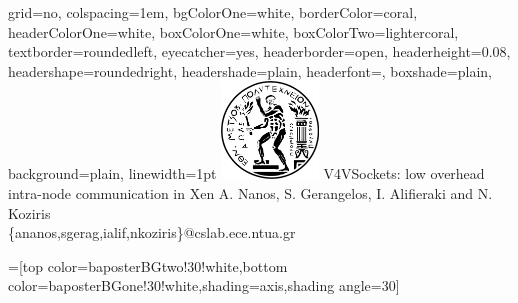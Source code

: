\documentclass[a4shrink,portrait,final]{baposter}
\begin{document}
\newlength{\leftimgwidth}
\begin{poster}%
  {
  grid=no,
  colspacing=1em,
  bgColorOne=white,
  borderColor=coral,
  headerColorOne=white,
  boxColorOne=white,
  boxColorTwo=lightercoral,
  textborder=roundedleft,
  eyecatcher=yes,
  headerborder=open,
  headerheight=0.08\textheight,
  headershape=roundedright,
  headershade=plain,
  headerfont=\Large\textsf, %
  boxshade=plain,
  background=plain,
  linewidth=1pt
  }
  {\includegraphics[height=7.0em]{ntua_logo.pdf}} %
  {\sf %
  V4VSockets: low overhead intra-node communication in Xen}
  {\sf %
  A. Nanos, S. Gerangelos, I. Alifieraki and N. Koziris\\
  \{ananos,sgerag,ialif,nkoziris\}@cslab.ece.ntua.gr
  }
  {%
  }

  =[top color=baposterBGtwo!30!white,bottom color=baposterBGone!30!white,shading=axis,shading angle=30]

     \setlength{\leftimgwidth}{0.78em+8.0em}


\end{poster}
\end{document}
